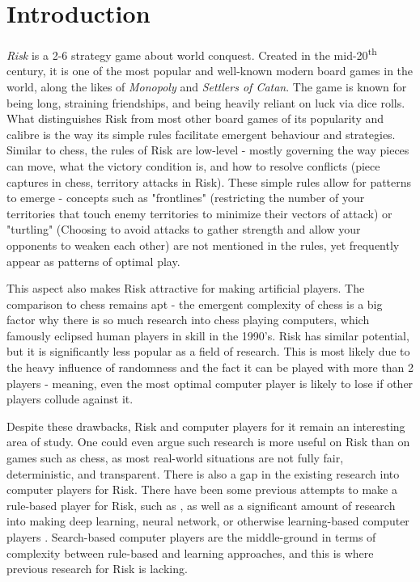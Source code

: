 \graphicspath{ {./Images/} }
\chapter{Introduction}
\label{introduction}

\textit{Risk} is a 2-6 strategy game about world conquest. Created in the mid-20\textsuperscript{th} century, it is one of the most popular and well-known modern board games in the world, along the likes of \textit{Monopoly} and \textit{Settlers of Catan}. The game is known for being long, straining friendships, and being heavily reliant on luck via dice rolls. What distinguishes Risk from most other board games of its popularity and calibre is the way its simple rules facilitate emergent behaviour and strategies. Similar to chess, the rules of Risk are low-level - mostly governing the way pieces can move, what the victory condition is, and how to resolve conflicts (piece captures in chess, territory attacks in Risk). These simple rules allow for patterns to emerge - concepts such as "frontlines" (restricting the number of your territories that touch enemy territories to minimize their vectors of attack) or "turtling" (Choosing to avoid attacks to gather strength and allow your opponents to weaken each other) are not mentioned in the rules, yet frequently appear as patterns of optimal play.

This aspect also makes Risk attractive for making artificial players. The comparison to chess remains apt - the emergent complexity of chess is a big factor why there is so much research into chess playing computers, which famously eclipsed human players in skill in the 1990's. Risk has similar potential, but it is significantly less popular as a field of research. This is most likely due to the heavy influence of randomness and the fact it can be played with more than 2 players - meaning, even the most optimal computer player is likely to lose if other players collude against it.

Despite these drawbacks, Risk and computer players for it remain an interesting area of study. One could even argue such research is more useful on Risk than on games such as chess, as most real-world situations are not fully fair, deterministic, and transparent. There is also a gap in the existing research into computer players for Risk. There have been some previous attempts to make a rule-based player for Risk, such as \cite{wolf2005intelligent}, as well as a significant amount of research into making deep learning, neural network, or otherwise learning-based computer players \cite{bauer2023artificial,blomqvist2020playing,olsson2005multi}. Search-based computer players are the middle-ground in terms of complexity between rule-based and learning approaches, and this is where previous research for Risk is lacking.

